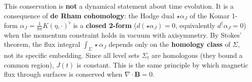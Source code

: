 \begin{remark}
This conservation is \textbf{not} a dynamical statement about time evolution. It is a consequence of \textbf{de Rham cohomology}: the Hodge dual $\star\alpha_J$ of the Komar 1-form $\alpha_J = \frac{1}{8\pi}K(\eta,\cdot)^\flat$ is a \textbf{closed 2-form} ($d(\star\alpha_J) = 0$, equivalently $d^\dagger\alpha_J = 0$) when the momentum constraint holds in vacuum with axisymmetry. By Stokes' theorem, the flux integral $\int_{\Sigma} \star\alpha_J$ depends only on the \textbf{homology class} of $\Sigma$, not its specific embedding. Since all level sets $\Sigma_t$ are homologous (they bound a common region), $J(t)$ is constant. This is the same principle by which magnetic flux through surfaces is conserved when $\nabla \cdot \mathbf{B} = 0$.
\end{remark}

